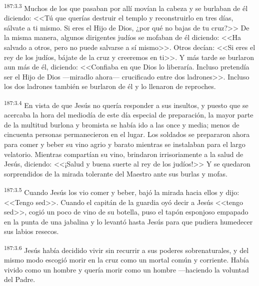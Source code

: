 \par 
\textsuperscript{187:3.3} Muchos de los que pasaban por allí movían la cabeza y se burlaban de él diciendo: <<Tú que querías destruir el templo y reconstruirlo en tres días, sálvate a ti mismo. Si eres el Hijo de Dios, ¿por qué no bajas de tu cruz?>> De la misma manera, algunos dirigentes judíos se mofaban de él diciendo: <<Ha salvado a otros, pero no puede salvarse a sí mismo>>. Otros decían: <<Si eres el rey de los judíos, bájate de la cruz y creeremos en ti>>. Y más tarde se burlaron aun más de él, diciendo: <<Confiaba en que Dios lo liberaría. Incluso pretendía ser el Hijo de Dios ---miradlo ahora--- crucificado entre dos ladrones>>. Incluso los dos ladrones también se burlaron de él y lo llenaron de reproches.

\par 
\textsuperscript{187:3.4} En vista de que Jesús no quería responder a sus insultos, y puesto que se acercaba la hora del mediodía de este día especial de preparación, la mayor parte de la multitud burlona y bromista se había ido a las once y media; menos de cincuenta personas permanecieron en el lugar. Los soldados se prepararon ahora para comer y beber su vino agrio y barato mientras se instalaban para el largo velatorio. Mientras compartían su vino, brindaron irrisoriamente a la salud de Jesús, diciendo: <<¡Salud y buena suerte al rey de los judíos!>> Y se quedaron sorprendidos de la mirada tolerante del Maestro ante sus burlas y mofas.

\par 
\textsuperscript{187:3.5} Cuando Jesús los vio comer y beber, bajó la mirada hacia ellos y dijo: <<Tengo sed>>. Cuando el capitán de la guardia oyó decir a Jesús <<tengo sed>>, cogió un poco de vino de su botella, puso el tapón esponjoso empapado en la punta de una jabalina y lo levantó hasta Jesús para que pudiera humedecer sus labios resecos.

\par 
\textsuperscript{187:3.6} Jesús había decidido vivir sin recurrir a sus poderes sobrenaturales, y del mismo modo escogió morir en la cruz como un mortal común y corriente. Había vivido como un hombre y quería morir como un hombre ---haciendo la voluntad del Padre.

